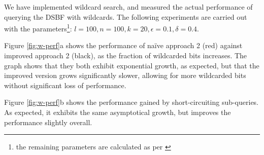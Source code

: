 \documentclass[a4paper,11pt]{article}
\begin{document}
We have implemented wildcard search, and measured the actual performance of querying the DSBF with wildcards. The following experiments are carried out with the parameters\footnote{the remaining parameters are calculated as per \cite{paper:harvard}}: $l = 100, n = 100, k = 20, \epsilon=0.1, \delta=0.4$.

Figure \ref{fig:w-perf}a shows the performance of naïve approach 2 (red) against improved approach 2 (black), as the fraction of wildcarded bits increases. The graph shows that they both exhibit exponential growth, as expected, but that the improved version grows significantly slower, allowing for more wildcarded bits without significant loss of performance.

Figure \ref{fig:w-perf}b shows the performance gained by short-circuiting sub-queries. As expected, it exhibits the same asymptotical growth, but improves the performance slightly overall.
\end{document}
